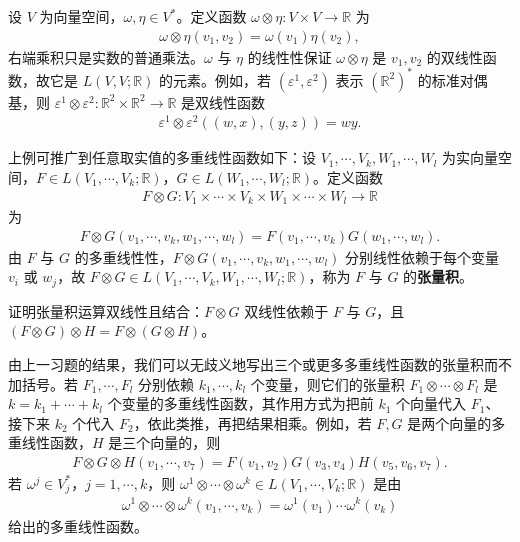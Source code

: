 \documentclass[../../main.tex]{subfiles}
\begin{document}
\begin{example}[余向量的张量积]\label{example:ch12-余向量张量积}
设 $V$ 为向量空间，$\omega,\eta\in V^*$。定义函数 $\omega\otimes\eta\colon V\times V\to\mathbb{R}$ 为
\begin{align}
\omega\otimes\eta(v_1,v_2)=\omega(v_1)\eta(v_2),\label{align:ch12-余向量张量积}
\end{align}
右端乘积只是实数的普通乘法。$\omega$ 与 $\eta$ 的线性性保证 $\omega\otimes\eta$ 是 $v_1,v_2$ 的双线性函数，故它是 $L(V,V;\mathbb{R})$ 的元素。例如，若 $(\varepsilon^1,\varepsilon^2)$ 表示 $(\mathbb{R}^2)^*$ 的标准对偶基，则 $\varepsilon^1\otimes\varepsilon^2\colon\mathbb{R}^2\times\mathbb{R}^2\to\mathbb{R}$ 是双线性函数
\begin{align*}
\varepsilon^1\otimes\varepsilon^2((w,x),(y,z))=wy.
\end{align*}
\end{example}

上例可推广到任意取实值的多重线性函数如下：设 $V_1,\cdots ,V_k,W_1,\cdots ,W_l$ 为实向量空间，$F\in L(V_1,\cdots ,V_k;\mathbb{R})$，$G\in L(W_1,\cdots ,W_l;\mathbb{R})$。定义函数
\begin{align*}
F\otimes G\colon V_1\times\cdots\times V_k\times W_1\times\cdots\times W_l\to\mathbb{R}
\end{align*}
为
\begin{align}
F\otimes G(v_1,\cdots ,v_k,w_1,\cdots ,w_l)=F(v_1,\cdots ,v_k)G(w_1,\cdots ,w_l).\label{align:ch12-函数张量积}
\end{align}
由 $F$ 与 $G$ 的多重线性性，$F\otimes G(v_1,\cdots ,v_k,w_1,\cdots ,w_l)$ 分别线性依赖于每个变量 $v_i$ 或 $w_j$，故 $F\otimes G\in L(V_1,\cdots ,V_k,W_1,\cdots ,W_l;\mathbb{R})$，称为 $F$ 与 $G$ 的\textbf{张量积}。

\begin{exercise}\label{exercise:ch12-03}
证明张量积运算双线性且结合：$F\otimes G$ 双线性依赖于 $F$ 与 $G$，且 $(F\otimes G)\otimes H=F\otimes(G\otimes H)$。
\end{exercise}

由上一习题的结果，我们可以无歧义地写出三个或更多多重线性函数的张量积而不加括号。若 $F_1,\cdots ,F_l$ 分别依赖 $k_1,\cdots ,k_l$ 个变量，则它们的张量积 $F_1\otimes\cdots\otimes F_l$ 是 $k=k_1+\cdots+k_l$ 个变量的多重线性函数，其作用方式为把前 $k_1$ 个向量代入 $F_1$、接下来 $k_2$ 个代入 $F_2$，依此类推，再把结果相乘。例如，若 $F,G$ 是两个向量的多重线性函数，$H$ 是三个向量的，则
\begin{align*}
F\otimes G\otimes H(v_1,\cdots ,v_7)=F(v_1,v_2)G(v_3,v_4)H(v_5,v_6,v_7).
\end{align*}
若 $\omega^j\in V_j^*$，$j=1,\cdots ,k$，则 $\omega^1\otimes\cdots\otimes\omega^k\in L(V_1,\cdots ,V_k;\mathbb{R})$ 是由
\begin{align}
\omega^1\otimes\cdots\otimes\omega^k(v_1,\cdots ,v_k)=\omega^1(v_1)\cdots\omega^k(v_k)\label{align:ch12-多重张量积}
\end{align}
给出的多重线性函数。
\end{document}
